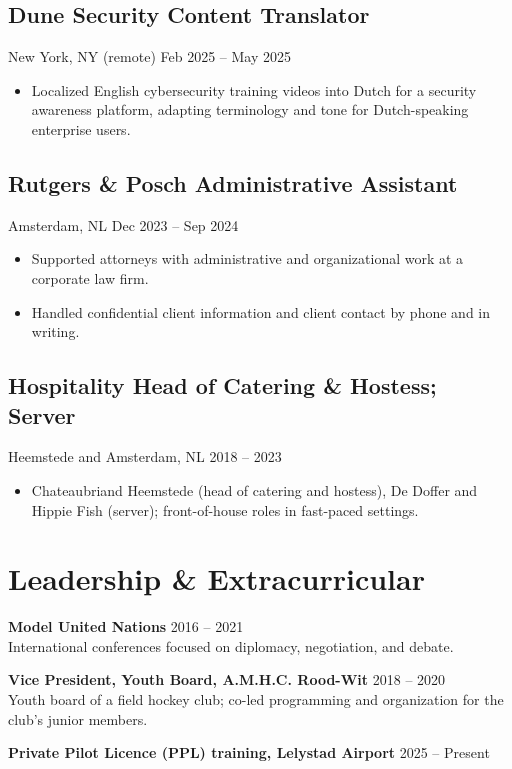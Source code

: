 \documentclass[10pt,letterpaper]{article}
\begin{document}
\subsection{Dune Security \hfill Content Translator}
New York, NY (remote) \hfill Feb 2025 -- May 2025
\begin{itemize}
\item Localized English cybersecurity training videos into Dutch for a security awareness platform, adapting terminology and tone for Dutch-speaking enterprise users.
\end{itemize}
\subsection{Rutgers \& Posch \hfill Administrative Assistant}
Amsterdam, NL \hfill Dec 2023 -- Sep 2024
\begin{itemize}
\item Supported attorneys with administrative and organizational work at a corporate law firm.
\item Handled confidential client information and client contact by phone and in writing.
\end{itemize}
\subsection{Hospitality \hfill Head of Catering \& Hostess; Server}
Heemstede and Amsterdam, NL \hfill 2018 -- 2023
\begin{itemize}
\item Chateaubriand Heemstede (head of catering and hostess), De Doffer and Hippie Fish (server); front-of-house roles in fast-paced settings.
\end{itemize}
\section{Leadership \& Extracurricular}
\textbf{Model United Nations} \hfill 2016 -- 2021 \\
International conferences focused on diplomacy, negotiation, and debate.
\vspace{2pt}

\textbf{Vice President, Youth Board, A.M.H.C. Rood-Wit} \hfill 2018 -- 2020 \\
Youth board of a field hockey club; co-led programming and organization for the club's junior members.
\vspace{2pt}

\textbf{Private Pilot Licence (PPL) training, Lelystad Airport} \hfill 2025 -- Present
\end{document}
